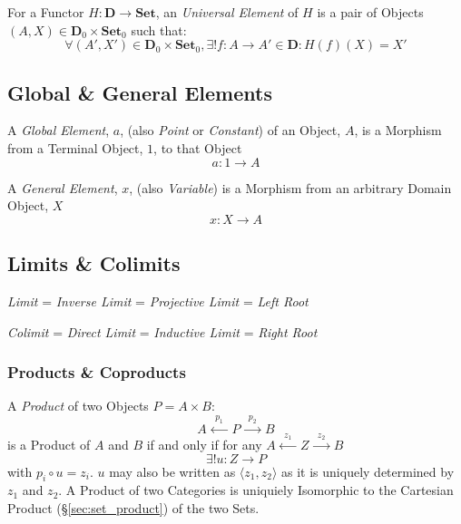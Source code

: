 For a Functor $H : \mathbf{D} \rightarrow \mathbf{Set}$, an
\emph{Universal Element} of $H$ is a pair of Objects $(A,X) \in
\mathbf{D}_0 \times \mathbf{Set}_0$ such that:
\[
    \forall (A',X') \in \mathbf{D}_0 \times \mathbf{Set}_0,
    \exists! f : A \rightarrow A' \in \mathbf{D} : H(f)(X) = X'
\]



\subsection{Global \& General Elements}\label{sec:general_element}

A \emph{Global Element}, $a$, (also \emph{Point} or \emph{Constant})
of an Object, $A$, is a Morphism from a Terminal Object, $1$, to that
Object
\[
    a: 1 \rightarrow A
\]

A \emph{General Element}, $x$, (also \emph{Variable}) is a Morphism
from an arbitrary Domain Object, $X$
\[
    x: X \rightarrow A
\]



\subsection{Limits \& Colimits}\label{sec:category_limits}

\emph{Limit} = \emph{Inverse Limit} = \emph{Projective Limit} =
\emph{Left Root}

\emph{Colimit} = \emph{Direct Limit} = \emph{Inductive Limit} =
\emph{Right Root}



\subsubsection{Products \& Coproducts}\label{sec:universal_product}

A \emph{Product} of two Objects $P = A \times B$:
\[
    A \xleftarrow{\;\;p_1\;\;} P \xrightarrow{\;\;p_2\;\;} B
\]
is a Product of $A$ and $B$ if and only if for any $A
\xleftarrow{\;\;z_1\;\;} Z \xrightarrow{\;\;z_2\;\;} B$
\[
    \exists!u : Z \rightarrow P
\]
with $p_i \circ u = z_i$. $u$ may also be written as $\langle z_1, z_2
\rangle$ as it is uniquely determined by $z_1$ and $z_2$. A Product of
two Categories is uniquiely Isomorphic to the Cartesian Product
(\S\ref{sec:set_product}) of the two Sets.

